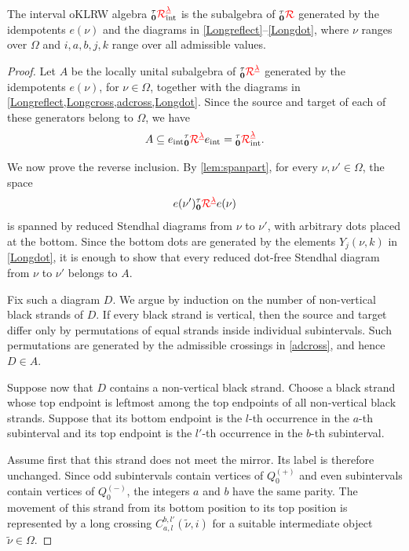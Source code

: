 \begin{prop}
\label{prop:intgen}
The interval oKLRW algebra ${{}^\tau_{\mathbf{0}}{\color{red}\mathcal{R}}^{{{\color{red}\underline{\lambda}}}}_{\text{int}}}$ is the subalgebra of ${}^\tau_{{\mathbf{0}}}{{{\color{red}\mathcal{R}}}}$ generated by the idempotents $e(\nu)$ and the diagrams in \cref{Longreflect}--\cref{Longdot}, where $\nu$ ranges over $\Omega$ and $i,a,b,j,k$ range over all admissible values.
\end{prop}

\begin{proof}
Let \(A\) be the locally unital subalgebra of
\({}^\tau_{{\mathbf{0}}}{{{\color{red}\mathcal{R}}}}^{{{\color{red}\underline{\lambda}}}}\) generated by the idempotents \(e(\nu)\), for
\(\nu\in\Omega\), together with the diagrams in
\cref{Longreflect,Longcross,adcross,Longdot}. Since the source and
target of each of these generators belong to \(\Omega\), we have
\[
    A
    \subseteq
    e_{\text{int}}{}^\tau_{{\mathbf{0}}}{{{\color{red}\mathcal{R}}}}^{{{\color{red}\underline{\lambda}}}}e_{\text{int}}
    =
    {{}^\tau_{\mathbf{0}}{\color{red}\mathcal{R}}^{{{\color{red}\underline{\lambda}}}}_{\text{int}}}.
\]

We now prove the reverse inclusion. By \cref{lem:spanpart}, for every
\(\nu,\nu'\in\Omega\), the space
\[
    e(\nu'){}^\tau_{{\mathbf{0}}}{{{\color{red}\mathcal{R}}}}^{{{\color{red}\underline{\lambda}}}}e(\nu)
\]
is spanned by reduced Stendhal diagrams from \(\nu\) to \(\nu'\),
with arbitrary dots placed at the bottom. Since the bottom dots are
generated by the elements \(Y_j(\nu,k)\) in \cref{Longdot}, it is
enough to show that every reduced dot-free Stendhal diagram from
\(\nu\) to \(\nu'\) belongs to \(A\).

Fix such a diagram \(D\). We argue by induction on the number of
non-vertical black strands of \(D\). If every black strand is
vertical, then the source and target differ only by permutations of
equal strands inside individual subintervals. Such permutations are
generated by the admissible crossings in \cref{adcross}, and hence
\(D\in A\).

Suppose now that \(D\) contains a non-vertical black strand. Choose a
black strand whose top endpoint is leftmost among the top endpoints
of all non-vertical black strands. Suppose that its bottom endpoint
is the \(l\)-th occurrence in the \(a\)-th subinterval and its top
endpoint is the \(l'\)-th occurrence in the \(b\)-th subinterval.

Assume first that this strand does not meet the mirror. Its label is
therefore unchanged. Since odd subintervals contain vertices of
\(Q_0^{(+)}\) and even subintervals contain vertices of
\(Q_0^{(-)}\), the integers \(a\) and \(b\) have the same parity.
The movement of this strand from its bottom position to its top
position is represented by a long crossing
\(
    C_{a,l}^{b,l'}(\widetilde\nu,i)
\)
for a suitable intermediate object \(\widetilde\nu\in\Omega\).


\end{proof}
